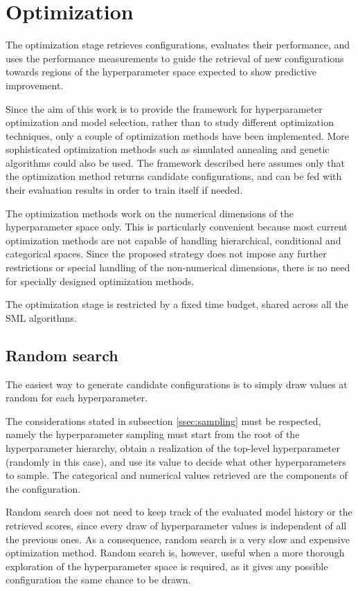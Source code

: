 \section{Optimization}

The optimization stage retrieves configurations, evaluates their performance, and uses the
performance measurements to guide the retrieval of new configurations towards regions of the
hyperparameter space expected to show predictive improvement.

Since the aim of this work is to provide the framework for hyperparameter optimization and model
selection, rather than to study different optimization techniques, only a couple of optimization
methods have been implemented. More sophisticated optimization methods such as simulated annealing
and genetic algorithms could also be used. The framework described here assumes only that the
optimization method returns candidate configurations, and can be fed with their evaluation results
in order to train itself if needed.

The optimization methods work on the numerical dimensions of the hyperparameter space
only. This is particularly convenient because most current optimization methods are not capable of
handling hierarchical, conditional and categorical spaces. Since the proposed strategy does not impose
any further restrictions or special handling of the non-numerical dimensions, there is no need for
specially designed optimization methods.

The optimization stage is restricted by a fixed time budget, shared across all the SML algorithms.

\subsection{Random search}

The easiest way to generate candidate configurations is to simply draw values at random for each
hyperparameter.

The considerations stated in  subsection \ref{ssec:sampling} must be respected, namely the
hyperparameter sampling must start from the root of the hyperparameter hierarchy, obtain a
realization of the top-level hyperparameter (randomly in this case), and use its value to decide
what other hyperparameters to sample. The categorical and numerical values retrieved are the
components of the configuration.

Random search does not need to keep track of the evaluated model history or the retrieved scores,
since every draw of hyperparameter values is independent of all the previous ones. As a consequence,
random search is a very slow and expensive optimization method. Random search is, however, 
useful when a more thorough exploration of the hyperparameter space is required, as it gives any
possible configuration the same chance to be drawn.

